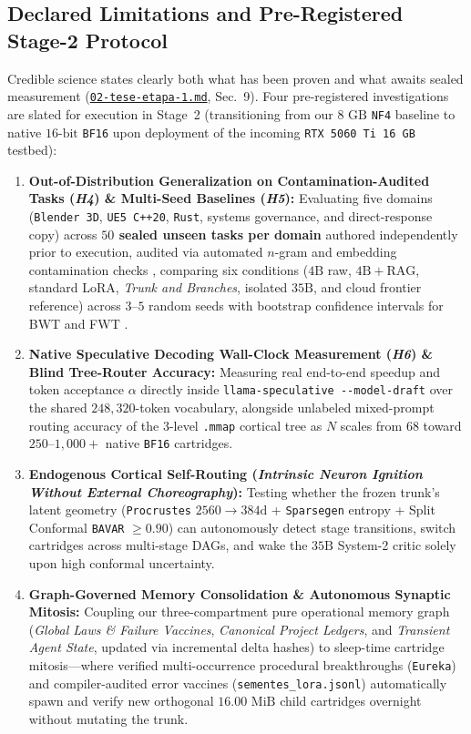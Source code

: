 \documentclass[10pt,a4paper]{article}
\begin{document}
\subsection{Declared Limitations and Pre-Registered Stage-2 Protocol}

Credible science states clearly both what has been proven and what awaits sealed measurement (\href{https://drive.google.com/file/d/1qvnH-nLVMc43T-prWSRTKEDJak89TSp7/view?usp=drivesdk}{\texttt{02-tese-\allowbreak{}etapa-1.md}}, Sec.~9). Four pre-registered investigations are slated for execution in Stage~2 (transitioning from our $8\text{ GB}$ \texttt{NF4} baseline to native $16\text{-bit}$ \texttt{BF16} upon deployment of the incoming \texttt{RTX 5060 Ti 16 GB} testbed):
\begin{enumerate}
  \item \textbf{Out-of-Distribution Generalization on Contamination-Audited Tasks (\textit{H4}) \& Multi-Seed Baselines (\textit{H5}):} Evaluating five domains (\texttt{Blender 3D}, \texttt{UE5 C++20}, \texttt{Rust}, systems governance, and direct-response copy) across \textbf{$50$ sealed unseen tasks per domain} authored independently prior to execution, audited via automated $n$-gram and embedding contamination checks \cite{golchin2024contamination}, comparing six conditions ($4\text{B}$ raw, $4\text{B}+\text{RAG}$, standard LoRA, \textit{Trunk and Branches}, isolated $35\text{B}$, and cloud frontier reference) across $3\text{--}5$ random seeds with bootstrap confidence intervals for BWT and FWT \cite{lopezpaz2017gem,chaudhry2018rwalk}.
  \item \textbf{Native Speculative Decoding Wall-Clock Measurement (\textit{H6}) \& Blind Tree-Router Accuracy:} Measuring real end-to-end speedup and token acceptance $\alpha$ directly inside \texttt{llama-speculative -{}-model-draft} over the shared $248,320$-token vocabulary, alongside unlabeled mixed-prompt routing accuracy of the 3-level \texttt{.mmap} cortical tree as $N$ scales from $68$ toward $250\text{--}1,000+$ native \texttt{BF16} cartridges.
  \item \textbf{Endogenous Cortical Self-Routing (\textit{Intrinsic Neuron Ignition Without External Choreography}):} Testing whether the frozen trunk's latent geometry (\texttt{Procrustes} $2560\to 384\text{d}$ + \texttt{Sparsegen} entropy + Split Conformal \texttt{BAVAR} $\ge 0.90$) can autonomously detect stage transitions, switch cartridges across multi-stage DAGs, and wake the $35\text{B}$ System-2 critic solely upon high conformal uncertainty.
  \item \textbf{Graph-Governed Memory Consolidation \& Autonomous Synaptic Mitosis:} Coupling our three-compartment pure operational memory graph (\textit{Global Laws \& Failure Vaccines}, \textit{Canonical Project Ledgers}, and \textit{Transient Agent State}, updated via incremental delta hashes) to sleep-time cartridge mitosis---where verified multi-occurrence procedural breakthroughs (\texttt{Eureka}) and compiler-audited error vaccines (\texttt{sementes\_\allowbreak{}lora.jsonl}) automatically spawn and verify new orthogonal $16.00\text{ MiB}$ child cartridges overnight without mutating the trunk.
\end{enumerate}
\end{document}
